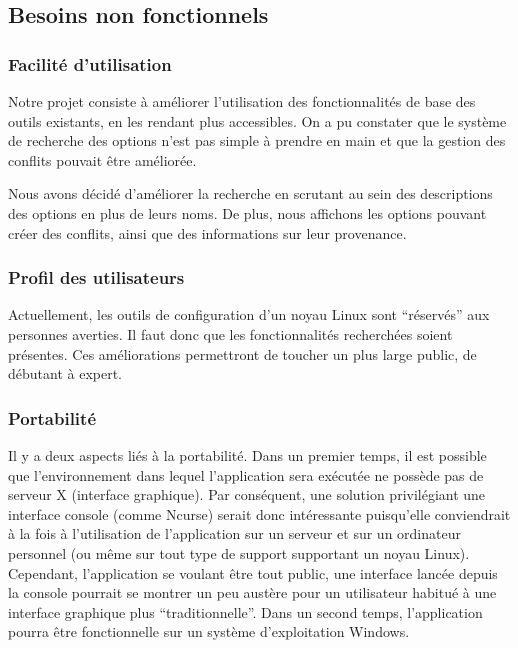 \documentclass[16pts]{report}
\begin{document}
        \subsection{Besoins non fonctionnels}
        \label{sub:Besoins non fonctionnels}
\subsubsection{Facilité d'utilisation}
\label{sec:Facilité d'utilisation}

Notre projet consiste à améliorer l’utilisation des fonctionnalités de base des
outils existants, en les rendant plus accessibles. On a pu constater que le
système de recherche des options n’est pas simple à prendre en main et que la
gestion des conflits pouvait être améliorée.

Nous avons décidé d’améliorer la recherche en scrutant au sein des descriptions
des options en plus de leurs noms. De plus, nous affichons les options pouvant
créer des conflits, ainsi que des informations sur leur provenance.

\subsubsection{Profil des utilisateurs}
\label{sec:Profil des utilisateurs}

Actuellement, les outils de configuration d’un noyau Linux sont “réservés” aux
personnes averties. Il faut donc que les fonctionnalités recherchées soient
présentes. Ces améliorations permettront de toucher un plus large public, de
débutant à expert.

\subsubsection{Portabilité}
\label{sec:Portabilité}

Il y a deux aspects liés à la portabilité. Dans un premier temps, il est
possible que l’environnement dans lequel l’application sera exécutée ne possède
pas de serveur X (interface graphique). Par conséquent, une solution
privilégiant une interface console (comme Ncurse) serait donc intéressante
puisqu’elle conviendrait à la fois à l’utilisation de l’application sur un
serveur et sur un ordinateur personnel (ou même sur tout type de support
supportant un noyau Linux). Cependant, l’application se voulant être tout
public, une interface lancée depuis la console pourrait se montrer un peu
austère pour un utilisateur habitué à une interface graphique plus
“traditionnelle”.  Dans un second temps, l’application pourra être
fonctionnelle sur un système d’exploitation Windows.
\end{document}
